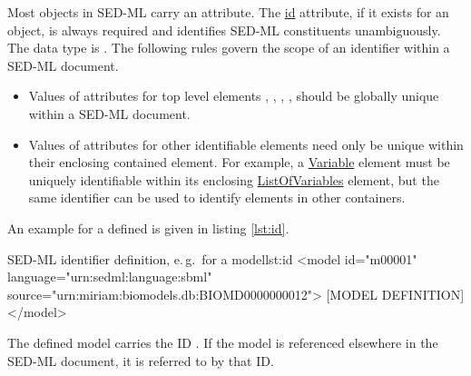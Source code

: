\label{sec:id}
%

Most objects in SED-ML carry an  attribute. 
The \hyperref[sec:id]{id} attribute, if it exists for an object, is always required and identifies SED-ML constituents unambiguously.   
The  data type is . The following rules govern the scope of an identifier within a SED-ML document.
\begin{itemize}
\item Values of  attributes for top level elements  , , , ,   should be globally unique within a SED-ML document. 
\item Values of  attributes for other identifiable elements need only be unique within their enclosing contained element. For example, a
 \hyperref[class:variable]{Variable} element must be uniquely identifiable within its enclosing  \hyperref[sec:listOfVariables] {ListOfVariables} element, but the same identifier can be used to identify elements  in other containers.
\end{itemize}
An example for a defined  is given in listing \ref{lst:id}.
%
\begin{myXmlLst}{SED-ML identifier definition, e.\,g.\ for a model}{lst:id}
<model id="m00001" language="urn:sedml:language:sbml" source="urn:miriam:biomodels.db:BIOMD0000000012">
 [MODEL DEFINITION]
</model>
\end{myXmlLst}
%
The defined model carries the ID . If the model is referenced elsewhere in the SED-ML document, it is referred to by that ID.

